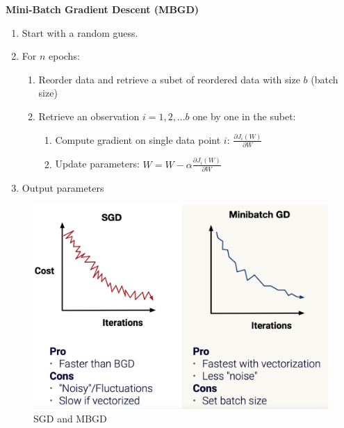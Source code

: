 \documentclass[11pt,a4paper]{article}
\begin{document}
\textbf{Mini-Batch Gradient Descent (MBGD)}
\begin{enumerate}
    \item Start with a random guess.
    \item For $n$ epochs:
    \begin{enumerate}[1)]
        \item Reorder data and retrieve a subet of reordered data with size $b$ (batch size)
        \item Retrieve an observation $i=1,2,...b$ one by one in the subet:
        \begin{enumerate}[(1)]
            \item Compute gradient on single data point $i$: $\frac{\partial J_i(W)}{\partial W}$
            \item Update parameters:
            $W=W-\alpha \frac{\partial J_i(W)}{\partial W}$
        \end{enumerate}
    \end{enumerate}
    \item Output parameters
\end{enumerate}
\begin{center}\begin{figure}[htbp]
    \centering
    \includegraphics[scale=0.1]{SGDandMBGD.png}
    \caption{SGD and MBGD}
    \label{}
\end{figure}\end{center}
\end{document}
